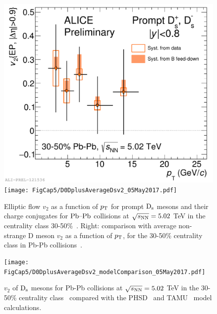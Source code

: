 \begin{figure}[!t]
\begin{center}
\includegraphics[width=.49\textwidth]{FigCap5/Dsv2_3050.pdf}
\texttt{[image: FigCap5/D0DplusAverageDsv2\_05May2017.pdf]}
\caption{Elliptic flow $v_2$ as a function of $p_{\rm T}$ for prompt ${\rm D_s}$ mesons 
and their charge conjugates for $\mbox{Pb--Pb}$ collisions at $\sqrt{s_{\rm NN}} = 5.02$ TeV in the centrality class 30-50\%~\cite{Acharya:2017qps}.
Right: comparison with average non-strange D meson $v_2$ as a function 
of $p_{\rm T}$, for the 30-50\% centrality class in Pb-Pb collisions~\cite{Acharya:2017qps}. }
\label{fig:v2_Ds} 
\end{center}
\end{figure}

\begin{figure}[!t]
\begin{center}
\texttt{[image: FigCap5/D0DplusAverageDsv2\_modelComparison\_05May2017.pdf]}
\caption{$v_2$ of ${\rm D_s}$ mesons for Pb-Pb collisions at $\sqrt{s_{\rm NN}} = 5.02$ TeV in the 30-50\% centrality class~\cite{Acharya:2017qps} compared with the PHSD~\cite{Song:2015ykw}  and TAMU~\cite{He:2014cla} model calculations.}
\label{fig:v2_models} 
\end{center}
\end{figure}


